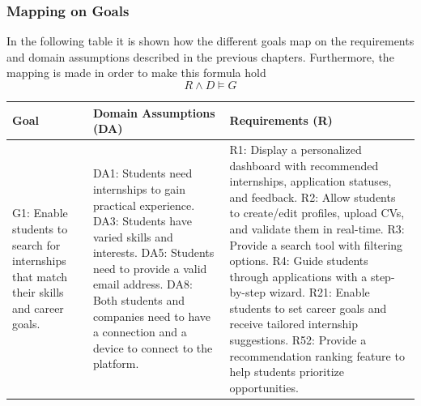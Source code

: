 \subsubsection{Mapping on Goals}
In the following table it is shown how the different goals map on the requirements and domain assumptions described in the previous chapters. Furthermore, the mapping is made in order to make this formula hold 
\begin{equation}
R \land D \models G
\end{equation}
\begin{longtable}{| p{} | p{} | p{} |}
\hline
\textbf{Goal} & \textbf{Domain Assumptions (DA)} & \textbf{Requirements (R)} \\ 
\hline
G1: Enable students to search for internships that match their skills and career goals. & DA1: Students need internships to gain practical experience. \newline DA3: Students have varied skills and interests. \newline DA5: Students need to provide a valid email address. \newline DA8: Both students and companies need to have a connection and a device to connect to the platform. & R1: Display a personalized dashboard with recommended internships, application statuses, and feedback. \newline R2: Allow students to create/edit profiles, upload CVs, and validate them in real-time. \newline R3: Provide a search tool with filtering options. \newline R4: Guide students through applications with a step-by-step wizard. \newline R21: Enable students to set career goals and receive tailored internship suggestions. \newline R52: Provide a recommendation ranking feature to help students prioritize opportunities. \\ \hline


\end{longtable}

